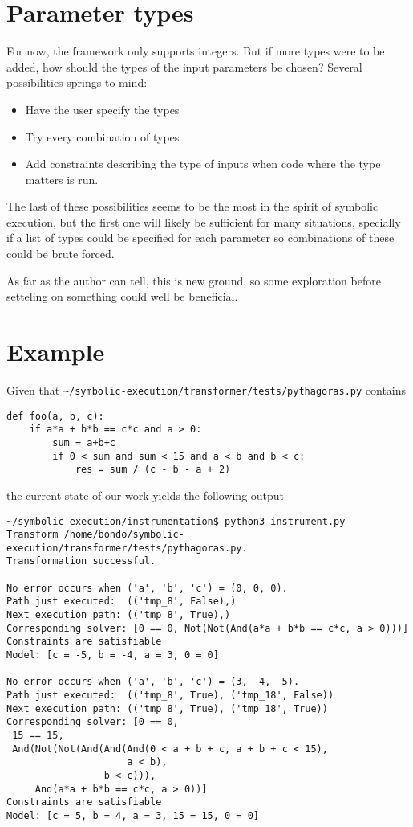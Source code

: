 \documentclass[11pt]{report}
\begin{document}
\begin{description}
\section{Parameter types}
For now, the framework only supports integers. But if more types were
to be added, how should the types of the input parameters be chosen?
Several possibilities springs to mind:
\begin{itemize}
  \item Have the user specify the types
  \item Try every combination of types
  \item Add constraints describing the type of inputs when code where
    the type matters is run.
\end{itemize}
The last of these possibilities seems to be the most in the spirit of
symbolic execution, but the first one will likely be sufficient for
many situations, specially if a list of types could be specified for
each parameter so combinations of these could be brute forced.

As far as the author can tell, this is new ground, so some exploration
before setteling on something could well be beneficial.

\section{Example}

Given that \verb|~/symbolic-execution/transformer/tests/pythagoras.py| contains
\begin{verbatim}
def foo(a, b, c):
    if a*a + b*b == c*c and a > 0:
        sum = a+b+c
        if 0 < sum and sum < 15 and a < b and b < c:
            res = sum / (c - b - a + 2)
\end{verbatim}

the current state of our work yields the following output

\begin{verbatim}
~/symbolic-execution/instrumentation$ python3 instrument.py
Transform /home/bondo/symbolic-execution/transformer/tests/pythagoras.py.
Transformation successful.

No error occurs when ('a', 'b', 'c') = (0, 0, 0).
Path just executed:  (('tmp_8', False),)
Next execution path: (('tmp_8', True),)
Corresponding solver: [0 == 0, Not(Not(And(a*a + b*b == c*c, a > 0)))]
Constraints are satisfiable
Model: [c = -5, b = -4, a = 3, 0 = 0] 

No error occurs when ('a', 'b', 'c') = (3, -4, -5).
Path just executed:  (('tmp_8', True), ('tmp_18', False))
Next execution path: (('tmp_8', True), ('tmp_18', True))
Corresponding solver: [0 == 0,
 15 == 15,
 And(Not(Not(And(And(And(0 < a + b + c, a + b + c < 15),
                     a < b),
                 b < c))),
     And(a*a + b*b == c*c, a > 0))]
Constraints are satisfiable
Model: [c = 5, b = 4, a = 3, 15 = 15, 0 = 0] 


\end{verbatim}
\end{description}
\end{document}
